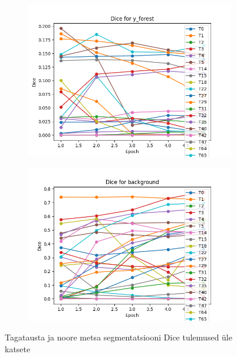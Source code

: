 \begin{figure}[H] %
    \centering
    \begin{subfigure}[b]{0.8\textwidth} %
        \includegraphics[width=\textwidth]{figures/tulemused/dice_per_class_y_forest.png} %
        \caption{} %
        \label{fig:dice_per_class_y_forest}
    \end{subfigure}
    \begin{subfigure}[b]{0.8\textwidth} %
        \includegraphics[width=\textwidth]{figures/tulemused/dice_per_class_background.png} %
        \caption{} %
        \label{fig:dice_per_class_background}
    \end{subfigure}
    
    \caption{Tagatausta ja noore metsa segmentatsiooni Dice tulemused üle katsete} %
    \label{fig:sidebyside_forest_bg} 
\end{figure}




